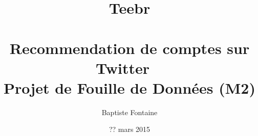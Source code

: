 
\title{Teebr\\
    ~\\
  \large Recommendation de comptes sur Twitter
    ~\\
  \large Projet de Fouille de Données (M2)}

\author{Baptiste Fontaine}
\date{?? mars 2015}
